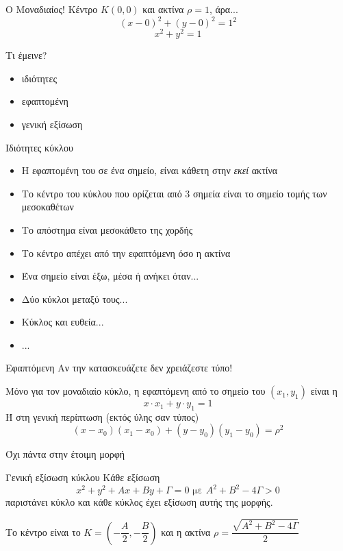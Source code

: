 \documentclass{presentation}
\begin{document}
\begin{frame}{Ο Μοναδιαίος!}
  Κέντρο $Κ(0,0)$ και ακτίνα $ρ=1$, άρα...
  $$(x-0)^2+(y-0)^2=1^2$$
  $$x^2+y^2=1$$
\end{frame}

\begin{frame}{Τι έμεινε?}
  \begin{itemize}
    \item ιδιότητες
    \item εφαπτομένη
    \item γενική εξίσωση
  \end{itemize}
\end{frame}

\begin{frame}{Ιδιότητες κύκλου}
  \begin{itemize}
    \item<1-> Η εφαπτομένη του σε ένα σημείο, είναι κάθετη στην \emph{εκεί} ακτίνα
    \item<2-> Το κέντρο του κύκλου που ορίζεται από $3$ σημεία είναι το σημείο τομής των μεσοκαθέτων
    \item<3-> Το απόστημα είναι μεσοκάθετο της χορδής
    \item<4-> Το κέντρο απέχει από την εφαπτόμενη όσο η ακτίνα
    \item<5-> Ένα σημείο είναι έξω, μέσα ή ανήκει όταν...
    \item<6-> Δύο κύκλοι μεταξύ τους...
    \item<7-> Κύκλος και ευθεία...
    \item<8-> ...
  \end{itemize}

\end{frame}

\begin{frame}[label=Εφαπτόμενη]{Εφαπτόμενη}
  Αν την κατασκευάζετε δεν χρειάζεστε τύπο!

  Μόνο για τον μοναδιαίο κύκλο, η εφαπτόμενη από το σημείο του $(x_1,y_1)$ είναι η
  $$x\cdot x_1+y\cdot y_1=1$$
  Ή στη γενική περίπτωση (εκτός ύλης σαν τύπος)
  $$(x-x_0)(x_1-x_0)+(y-y_0)(y_1-y_0)=ρ^2$$

  \hyperlink{Απόδειξη}{}
\end{frame}

\begin{frame}[label=ΓενικήΕξίσωση]{Όχι πάντα στην έτοιμη μορφή}

  \begin{block}{Γενική εξίσωση κύκλου}
    Κάθε εξίσωση
    $$x^2+y^2+Αx+Βy+Γ=0\text{ με }Α^2+Β^2-4Γ>0$$
    παριστάνει κύκλο και κάθε κύκλος έχει εξίσωση αυτής της μορφής.

    Το κέντρο είναι το $Κ=(-\dfrac{Α}{2},-\dfrac{Β}{2})$ και η ακτίνα $ρ=\dfrac{\sqrt{Α^2+Β^2-4Γ}}{2}$
  \end{block}

  \hyperlink{Απόδειξη2}{}

  \hyperlink{Απόδειξη3}{}
\end{frame}
\end{document}
